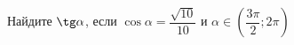\begin{ex}
	\begin{condition}
		Найдите \( \tg\alpha \), если \( \cos\alpha=\dfrac{\sqrt{10}}{10} \) и \( \alpha\in\left( \dfrac{3\pi}{2};2\pi \right) \)
	\end{condition}
\end{ex}